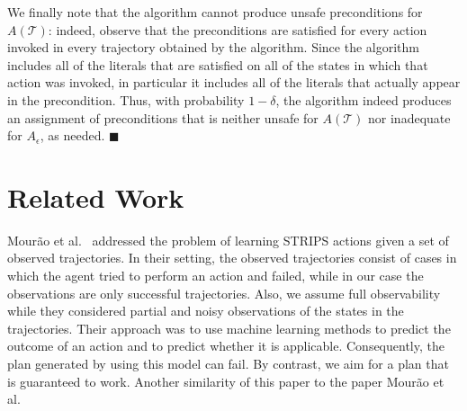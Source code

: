 \documentclass[letterpaper]{article}
\newenvironment{proof}{\noindent{\bf Proof:~~}}{\qed}
\newcommand{\qed}{\hfill\ensuremath{\blacksquare}}
\begin{document}
\begin{proof}

We finally note that the algorithm cannot produce unsafe preconditions for $A(\mathcal{T})$: indeed, observe that the preconditions are satisfied for every action invoked in every trajectory obtained by the algorithm. Since the algorithm includes all of the literals that are satisfied on all of the states in which that action was invoked, in particular it includes all of the literals that actually appear in the precondition. Thus, with probability $1-\delta$, the algorithm indeed produces an assignment of preconditions that is neither unsafe for $A(\mathcal{T})$ nor inadequate for $A_\epsilon$, as needed.
\end{proof}


\section{Related Work}


Mour{\~{a}}o et al.~ addressed the problem of learning STRIPS actions given a set of observed trajectories. In their setting, the observed trajectories consist of cases in which the agent tried to perform an action and failed, while in our case the observations are only successful trajectories. Also, we assume full observability while they considered partial and noisy observations of the states in the trajectories. Their approach was to use machine learning methods to predict the outcome of an action and to predict whether it is applicable. Consequently, the plan generated by using this model can fail. By contrast, we aim for a plan that is guaranteed to work. Another similarity of this paper to the paper Mour{\~{a}}o et al.~ 
\end{document}
